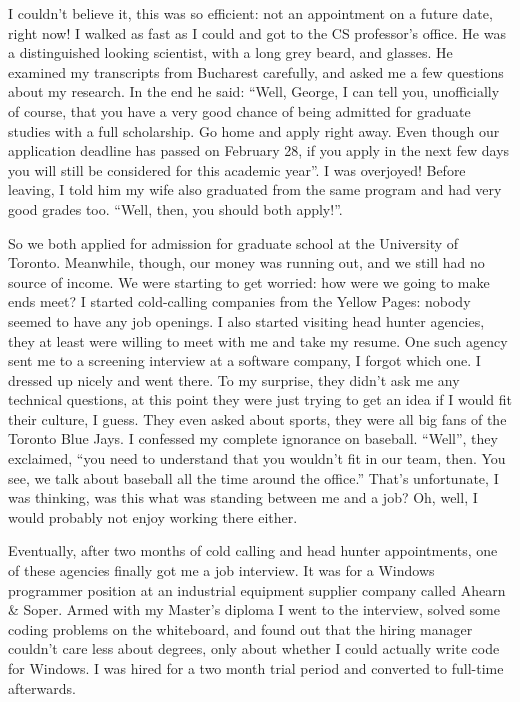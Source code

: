 \documentclass[12pt]{book}
\begin{document}
I couldn't believe it, this was so efficient: not an appointment on a
future date, right now! I walked as fast as I could and got to the CS
professor's office. He was a distinguished looking scientist, with a
long grey beard, and glasses. He examined my transcripts from Bucharest
carefully, and asked me a few questions about my research. In the end he
said: ``Well, George, I can tell you, unofficially of course, that you
have a very good chance of being admitted for graduate studies with a
full scholarship. Go home and apply right away. Even though our
application deadline has passed on February 28, if you apply in the next
few days you will still be considered for this academic year''. I was
overjoyed! Before leaving, I told him my wife also graduated from the
same program and had very good grades too. ``Well, then, you should both
apply!''.

So we both applied for admission for graduate school at the University
of Toronto. Meanwhile, though, our money was running out, and we still
had no source of income. We were starting to get worried: how were we
going to make ends meet? I started cold-calling companies from the
Yellow Pages: nobody seemed to have any job openings. I also started
visiting head hunter agencies, they at least were willing to meet with
me and take my resume. One such agency sent me to a screening interview
at a software company, I forgot which one. I dressed up nicely and went
there. To my surprise, they didn't ask me any technical questions, at
this point they were just trying to get an idea if I would fit their
culture, I guess. They even asked about sports, they were all big fans
of the Toronto Blue Jays. I confessed my complete ignorance on baseball.
``Well'', they exclaimed, ``you need to understand that you wouldn't fit
in our team, then. You see, we talk about baseball all the time around
the office.'' That's unfortunate, I was thinking, was this what was
standing between me and a job? Oh, well, I would probably not enjoy
working there either.

Eventually, after two months of cold calling and head hunter
appointments, one of these agencies finally got me a job interview. It
was for a Windows programmer position at an industrial equipment
supplier company called Ahearn \& Soper. Armed with my Master's diploma
I went to the interview, solved some coding problems on the whiteboard,
and found out that the hiring manager couldn't care less about degrees,
only about whether I could actually write code for Windows. I was hired
for a two month trial period and converted to full-time afterwards.
\end{document}
